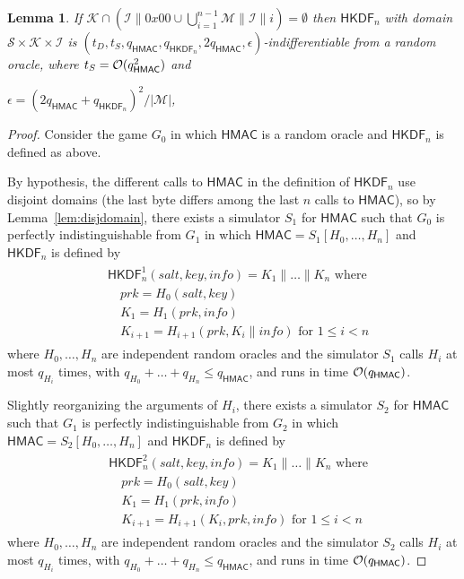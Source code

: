 \documentclass[compsoc, conference, letterpaper, 10pt, times]{IEEEtran}
\newif\ifapproxproba
\newcommand{\HKDF}{\mathsf{HKDF}}
\newtheorem{lemma}{Lemma}
\newcommand{\salt}{\mathit{salt}}
\newcommand{\key}{\mathit{key}}
\newcommand{\info}{\mathit{info}}
\newcommand{\prk}{\mathit{prk}}
\newcommand{\hmac}{\mathsf{HMAC}}
\newcommand{\Ssalt}{\mathcal{S}}
\newcommand{\Skey}{\mathcal{K}}
\newcommand{\Sinfo}{\mathcal{I}}
\newcommand{\Smac}{\mathcal{M}}
\newcommand{\ab}{\allowbreak}
\begin{document}
\begin{lemma}\label{lem:hkdfindif}
If $\Skey \cap (\Sinfo \| 0x00 \cup \bigcup_{i = 1}^{n-1}\Smac \| \Sinfo \| i) = \emptyset$
then $\HKDF_n$ with domain $\Ssalt \times \Skey \times \Sinfo$ is
$(t_D, \ab t_S, \ab q_{\hmac}, \ab q_{\HKDF_n}, \ab 2q_{\hmac}, \ab \epsilon)$-indifferentiable from a random oracle,
where $t_S = {\cal O}(q_{\hmac}^2)$ and
\ifapproxproba
$\epsilon = {\cal O}((q_{\hmac} + q_{\HKDF_n})^2/|\Smac|)$,
and ${\cal O}$ just hides small constants.
\else
$\epsilon = (2q_{\hmac} + q_{\HKDF_n})^2/|\Smac|$,
\fi
\end{lemma}
\begin{proof}
Consider the game $G_0$ in which $\hmac$ is a random oracle and $\HKDF_n$
is defined as above.

By hypothesis, the different calls to $\hmac$ in the definition of 
$\HKDF_n$ use disjoint domains (the last byte differs among the last
$n$ calls to $\hmac$), so by Lemma~\ref{lem:disjdomain}, there exists
a simulator $S_1$ for $\hmac$ such that $G_0$ is
perfectly indistinguishable from $G_1$ in which
$\hmac = S_1[H_0, \ldots, H_n]$ and $\HKDF_n$ is defined by
\begin{align*}
\begin{split}
&\HKDF^1_n(\salt,\key,\info) = K_1 \| \dots \| K_n \text{ where}\\
&\quad \prk = H_0(\salt,\key)\\
&\quad K_1 = H_1(\prk, \info )\\
&\quad K_{i+1} = H_{i+1}(\prk, K_i \| \info) \text{ for }1 \leq i < n
\end{split}
\end{align*}
where $H_0, \dots, H_n$ are independent random oracles
and the simulator $S_1$ calls $H_i$ at most $q_{H_i}$ times, with
$q_{H_0} + \dots + q_{H_n} \leq q_{\hmac}$, and runs in time 
${\cal O}(q_{\hmac})$.

Slightly reorganizing the arguments of $H_i$, there exists a simulator $S_2$
for $\hmac$ such that $G_1$ is
perfectly indistinguishable from $G_2$ in which
$\hmac = S_2[H_0, \ldots, H_n]$ and $\HKDF_n$ is defined by
\begin{align*}
\begin{split}
&\HKDF^2_n(\salt,\key,\info) = K_1 \| \dots \| K_n \text{ where}\\
&\quad \prk = H_0(\salt,\key)\\
&\quad K_1 = H_1(\prk, \info )\\
&\quad K_{i+1} = H_{i+1}(K_i, \prk, \info) \text{ for }1 \leq i < n
\end{split}
\end{align*}
where $H_0, \dots, H_n$ are independent random oracles
and the simulator $S_2$ calls $H_i$ at most $q_{H_i}$ times, with
$q_{H_0} + \dots + q_{H_n} \leq q_{\hmac}$, and runs in time 
${\cal O}(q_{\hmac})$.


\end{proof}
\end{document}
